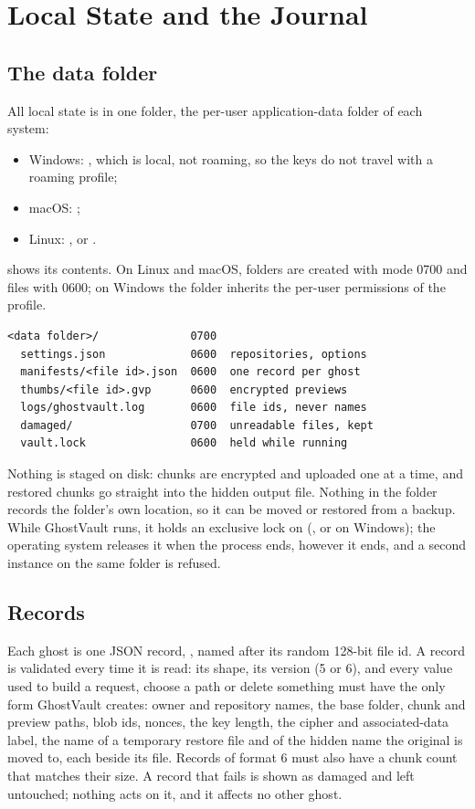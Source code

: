 \section{Local State and the Journal}\label{sec:state}

\subsection{The data folder}\label{sec:folder}
All local state is in one folder, the per-user application-data folder of each system:
\begin{itemize}
\item Windows: , which is local, not roaming, so the keys
do not travel with a roaming profile;
\item macOS: ;
\item Linux: , or .
\end{itemize}
 shows its contents. On Linux and macOS, folders are created with mode 0700 and
files with 0600; on Windows the folder inherits the per-user permissions of the profile.

\begin{lstlisting}[caption={The data folder (modes on Linux and macOS).},label={lst:folder}]
<data folder>/              0700
  settings.json             0600  repositories, options
  manifests/<file id>.json  0600  one record per ghost
  thumbs/<file id>.gvp      0600  encrypted previews
  logs/ghostvault.log       0600  file ids, never names
  damaged/                  0700  unreadable files, kept
  vault.lock                0600  held while running
\end{lstlisting}

Nothing is staged on disk: chunks are encrypted and uploaded one at a time, and restored chunks go
straight into the hidden output file. Nothing in the folder records the folder's own location, so it
can be moved or restored from a backup. While GhostVault runs, it holds an exclusive lock on
 (, or  on Windows); the operating system releases
it when the process ends, however it ends, and a second instance on the same folder is refused.

\subsection{Records}\label{sec:records}
Each ghost is one JSON record, , named after its random 128-bit file id. A record
is validated every time it is read: its shape, its version (5 or 6), and every value used to build a
request, choose a path or delete something must have the only form GhostVault creates: owner and
repository names, the base folder, chunk and preview paths, blob ids, nonces, the key length, the
cipher and associated-data label, the name of a temporary restore file and of the hidden name the
original is moved to, each beside its file. Records of format 6 must also have a chunk count that
matches their size. A record that fails is shown as damaged and left untouched; nothing acts on it,
and it affects no other ghost.

